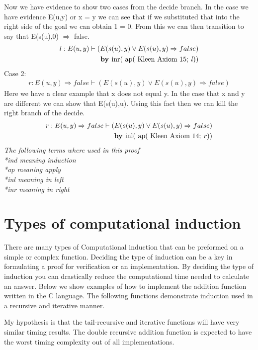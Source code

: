 \documentclass{article}
\newcommand{\tab}{\hspace*{2em}}
\begin{document}
Now we have evidence to show two cases from the decide branch. In the case we have evidence E(u,y) or x = y we can see that if we substituted that into the right side of the goal we can obtain 1 = 0. From this we can then transition to say that E(s(u),0) $\Rightarrow$ false.  
\begin{eqnarray}
l:E(u, y) \vdash (E(s(u),y) \vee E(s(u),y) \Rightarrow false) \nonumber\\ \tab \textbf{ by } \text{inr( ap( Kleen Axiom 15; \textit{l}))}
\end{eqnarray}
Case 2:
\begin{eqnarray}
r:E(u, y) \Rightarrow false \vdash (E(s(u),y) \vee E(s(u),y) \Rightarrow false) 
\end{eqnarray}
Here we have a clear example that x does not equal y. In the case that x and y are different we can show that E(s(u),u). Using this fact then we can kill the right branch of the decide. 
\begin{eqnarray}
r:E(u, y) \Rightarrow false \vdash (E(s(u),y) \vee E(s(u),y) \Rightarrow false) \nonumber\\ \tab \textbf{ by } \text{inl( ap( Kleen Axiom 14; \textit{r}))}
\end{eqnarray}
\textit{The following terms where used in this proof \\ *ind meaning induction \\ *ap meaning apply \\ *inl meaning in left \\ *inr meaning in right}

\section{Types of computational induction}
There are many types of Computational induction that can be preformed on a simple or complex function. Deciding the type of induction can be a key in formulating a proof for verification or an implementation. By deciding the type of induction you can drastically reduce the computational time needed to calculate an answer. Below we show examples of how to implement the addition function written in the C language. The following functions demonstrate induction used in a recursive and iterative manner. 

My hypothesis is that the tail-recursive and iterative functions will have very similar timing results. The double recursive addition function is expected to have the worst timing complexity out of all implementations.  
\end{document}
